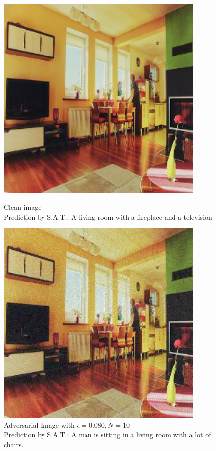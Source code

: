 \begin{figure}[ht]
    \centering
    \begin{minipage}{0.45\textwidth}
        \centering
        \includegraphics[width=0.9\textwidth]{figures/ShowDistractAndDeceive/n=10/samples/0.000/img_0.jpg} %
        \caption*{Clean image\\Prediction by S.A.T.: A living room with a fireplace and a television}
    \end{minipage}\hfill
    \begin{minipage}{0.45\textwidth}
        \centering
        \includegraphics[width=0.9\textwidth]{figures/ShowDistractAndDeceive/n=10/samples/0.080/img_0.jpg} %
        \caption*{Adversarial Image with $\epsilon=0.080, N=10$\\Prediction by S.A.T.: A man is sitting in a living room with a lot of chairs.}
    \end{minipage}
\end{figure}

